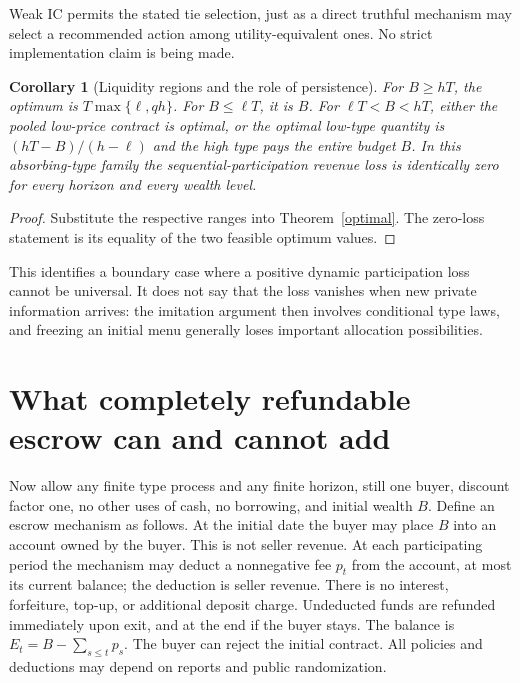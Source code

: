 \documentclass[11pt]{article}
\newtheorem{corollary}[theorem]{Corollary}
\theoremstyle{remark}
\begin{document}
Weak IC permits the stated tie selection, just as a direct truthful
mechanism may select a recommended action among utility-equivalent
ones. No strict implementation claim is being made.

\begin{corollary}[Liquidity regions and the role of persistence]
For $B\geq hT$, the optimum is $T\max\{\ell,qh\}$. For
$B\leq\ell T$, it is $B$. For $\ell T<B<hT$, either the pooled
low-price contract is optimal, or the optimal low-type quantity is
$(hT-B)/(h-\ell)$ and the high type pays the entire budget $B$.
In this absorbing-type family the sequential-participation revenue
loss is identically zero for every horizon and every wealth level.
\end{corollary}
\begin{proof}
Substitute the respective ranges into Theorem~\ref{optimal}. The
zero-loss statement is its equality of the two feasible optimum values.
\end{proof}

This identifies a boundary case where a positive dynamic participation
loss cannot be universal. It does not say that the loss vanishes when
new private information arrives: the imitation argument then involves
conditional type laws, and freezing an initial menu generally loses
important allocation possibilities.

\section{What completely refundable escrow can and cannot add}
Now allow any finite type process and any finite horizon, still one
buyer, discount factor one, no other uses of cash, no borrowing, and
initial wealth $B$. Define an escrow mechanism as follows. At the
initial date the buyer may place $B$ into an account owned by the buyer.
This is not seller revenue. At each participating period the mechanism
may deduct a nonnegative fee $p_t$ from the account, at most its current
balance; the deduction is seller revenue. There is no interest,
forfeiture, top-up, or additional deposit charge. Undeducted funds are
refunded immediately upon exit, and at the end if the buyer stays.
The balance is $E_t=B-\sum_{s\leq t}p_s$. The buyer can reject the
initial contract. All policies and deductions may depend on reports and
public randomization.
\end{document}
